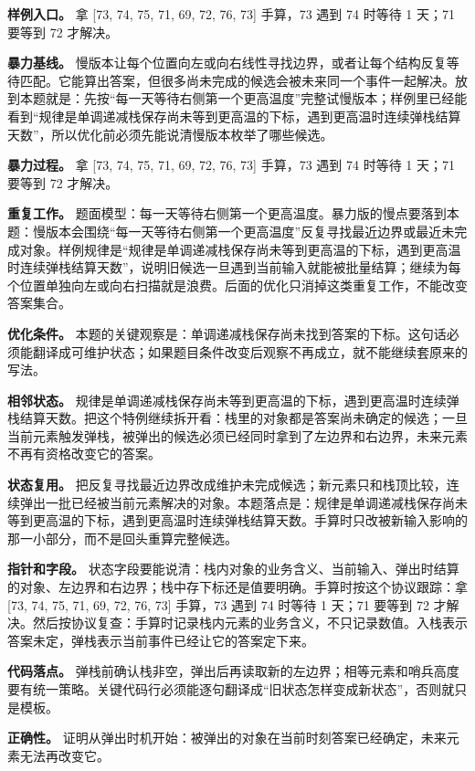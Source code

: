 \textbf{样例入口。} 拿 [73, 74, 75, 71, 69, 72, 76, 73] 手算，73 遇到 74 时等待 1 天；71 要等到 72 才解决。

\textbf{暴力基线。} 慢版本让每个位置向左或向右线性寻找边界，或者让每个结构反复等待匹配。它能算出答案，但很多尚未完成的候选会被未来同一个事件一起解决。放到本题就是：先按“每一天等待右侧第一个更高温度”完整试慢版本；样例里已经能看到“规律是单调递减栈保存尚未等到更高温的下标，遇到更高温时连续弹栈结算天数”，所以优化前必须先能说清慢版本枚举了哪些候选。

\textbf{暴力过程。} 拿 [73, 74, 75, 71, 69, 72, 76, 73] 手算，73 遇到 74 时等待 1 天；71 要等到 72 才解决。

\textbf{重复工作。} 题面模型：每一天等待右侧第一个更高温度。暴力版的慢点要落到本题：慢版本会围绕“每一天等待右侧第一个更高温度”反复寻找最近边界或最近未完成对象。样例规律是“规律是单调递减栈保存尚未等到更高温的下标，遇到更高温时连续弹栈结算天数”，说明旧候选一旦遇到当前输入就能被批量结算；继续为每个位置单独向左或向右扫描就是浪费。后面的优化只消掉这类重复工作，不能改变答案集合。

\textbf{优化条件。} 本题的关键观察是：单调递减栈保存尚未找到答案的下标。这句话必须能翻译成可维护状态；如果题目条件改变后观察不再成立，就不能继续套原来的写法。

\textbf{相邻状态。} 规律是单调递减栈保存尚未等到更高温的下标，遇到更高温时连续弹栈结算天数。把这个特例继续拆开看：栈里的对象都是答案尚未确定的候选；一旦当前元素触发弹栈，被弹出的候选必须已经同时拿到了左边界和右边界，未来元素不再有资格改变它的答案。

\textbf{状态复用。} 把反复寻找最近边界改成维护未完成候选；新元素只和栈顶比较，连续弹出一批已经被当前元素解决的对象。本题落点是：规律是单调递减栈保存尚未等到更高温的下标，遇到更高温时连续弹栈结算天数。手算时只改被新输入影响的那一小部分，而不是回头重算完整候选。

\textbf{指针和字段。} 状态字段要能说清：栈内对象的业务含义、当前输入、弹出时结算的对象、左边界和右边界；栈中存下标还是值要明确。手算时按这个协议跟踪：拿 [73, 74, 75, 71, 69, 72, 76, 73] 手算，73 遇到 74 时等待 1 天；71 要等到 72 才解决。然后按协议复查：手算时记录栈内元素的业务含义，不只记录数值。入栈表示答案未定，弹栈表示当前事件已经让它的答案定下来。

\textbf{代码落点。} 弹栈前确认栈非空，弹出后再读取新的左边界；相等元素和哨兵高度要有统一策略。关键代码行必须能逐句翻译成“旧状态怎样变成新状态”，否则就只是模板。

\textbf{正确性。} 证明从弹出时机开始：被弹出的对象在当前时刻答案已经确定，未来元素无法再改变它。

